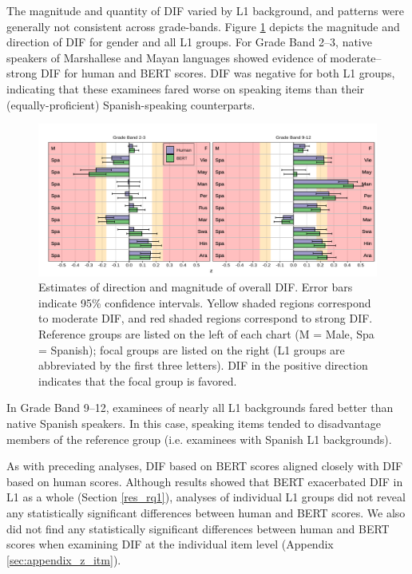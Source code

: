 \documentclass [PhD] {uclathes}
\begin{document}
The magnitude and quantity of DIF varied by L1 background, and patterns were generally not consistent across grade-bands. Figure \ref{fig:z_ovr} depicts the magnitude and direction of DIF for gender and all L1 groups. For Grade Band 2–3, native speakers of Marshallese and Mayan languages showed evidence of moderate–strong DIF for human and BERT scores. DIF was negative for both L1 groups, indicating that these examinees fared worse on speaking items than their (equally-proficient) Spanish-speaking counterparts. 

\begin{figure}[t]
    \centering
    \includegraphics[width=16cm]{figures/20230422_ETS-DIF_z_ovr_edit.pdf}
    \caption{Estimates of direction and magnitude of overall DIF. Error bars indicate 95\% confidence intervals. Yellow shaded regions correspond to moderate DIF, and red shaded regions correspond to strong DIF. Reference groups are listed on the left of each chart (M = Male, Spa = Spanish); focal groups are listed on the right (L1 groups are abbreviated by the first three letters). DIF in the positive direction indicates that the focal group is favored.}
    \label{fig:z_ovr}
\end{figure}

In Grade Band 9–12, examinees of nearly all L1 backgrounds fared better than native Spanish speakers. In this case, speaking items tended to disadvantage members of the reference group (i.e. examinees with Spanish L1 backgrounds). 

As with preceding analyses, DIF based on BERT scores aligned closely with DIF based on human scores. Although results showed that BERT exacerbated DIF in L1 as a whole (Section \ref{res_rq1}), analyses of individual L1 groups did not reveal any statistically significant differences between human and BERT scores. We also did not find any statistically significant differences between human and BERT scores when examining DIF at the individual item level (Appendix \ref{sec:appendix_z_itm}). 
\end{document}
